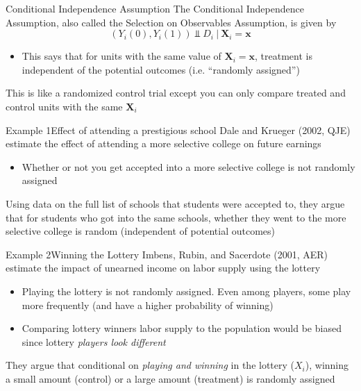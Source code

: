 \documentclass[aspectratio=169,t,11pt,table]{beamer}
\begin{document}
\begin{frame}{Conditional Independence Assumption}
  The \alert{Conditional Independence Assumption}, also called the \alert{Selection on Observables Assumption}, is given by
  $$
    (Y_{i}(0), Y_{i}(1)) \Perp D_i \ \vert \ \bm{X}_i = \bm{x}
  $$
  \begin{itemize}
    \item This says that for units with the same value of $\bm{X}_i = \bm{x}$, treatment is independent of the potential outcomes (i.e. ``randomly assigned'')
  \end{itemize}

  \pause
  \bigskip
  This is like a randomized control trial except you can only compare treated and control units with the same $\bm{X}_i$
\end{frame}

\begin{frame}{Example 1}{Effect of attending a prestigious school}
  Dale and Krueger (2002, QJE) estimate the effect of attending a more selective college on future earnings
  \begin{itemize}
    \item Whether or not you get accepted into a more selective college is not randomly assigned
  \end{itemize}

  \pause
  \bigskip
  Using data on the full list of schools that students were accepted to, they argue that for students who got into the same schools, whether they went to the more selective college is random (independent of potential outcomes)
\end{frame}

\begin{frame}{Example 2}{Winning the Lottery}
  Imbens, Rubin, and Sacerdote (2001, AER) estimate the impact of unearned income on labor supply using the lottery
  \begin{itemize}
    \item Playing the lottery is not randomly assigned. Even among players, some play more frequently (and have a higher probability of winning)
    
    \item Comparing lottery winners labor supply to the population would be biased since lottery \emph{players look different}
  \end{itemize}
  
  \pause
  \bigskip
  They argue that conditional on \emph{playing and winning} in the lottery ($X_i$), winning a small amount (control) or a large amount (treatment) is randomly assigned
\end{frame}
\end{document}
